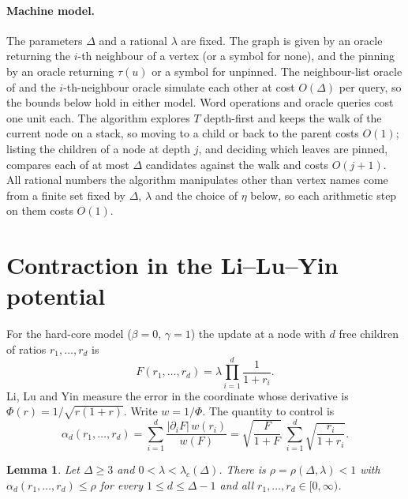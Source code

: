 \documentclass[11pt]{amsart}
\newtheorem{lemma}[theorem]{Lemma}
\newcommand{\lc}{\lambda_c(\Delta)}
\begin{document}
\paragraph{Machine model.} The parameters $\Delta$ and a rational $\lambda$ are fixed. The graph is given by an oracle returning the $i$-th neighbour of a vertex (or a symbol for none), and the pinning by an oracle returning $\tau(u)$ or a symbol for unpinned. The neighbour-list oracle of \cite[Definition~2.2]{CCLZ} and the $i$-th-neighbour oracle simulate each other at cost $O(\Delta)$ per query, so the bounds below hold in either model. Word operations and oracle queries cost one unit each. The algorithm explores $T$ depth-first and keeps the walk of the current node on a stack, so moving to a child or back to the parent costs $O(1)$; listing the children of a node at depth $j$, and deciding which leaves are pinned, compares each of at most $\Delta$ candidates against the walk and costs $O(j+1)$. All rational numbers the algorithm manipulates other than vertex names come from a finite set fixed by $\Delta$, $\lambda$ and the choice of $\eta$ below, so each arithmetic step on them costs $O(1)$.

\section{Contraction in the Li--Lu--Yin potential}\label{sec:contract}
For the hard-core model ($\beta=0$, $\gamma=1$) the update at a node with $d$ free children of ratios $r_1,\dots,r_d$ is
\[
F(r_1,\dots,r_d)=\lambda\prod_{i=1}^d\frac{1}{1+r_i}.
\]
Li, Lu and Yin \cite{LLY} measure the error in the coordinate whose derivative is $\Phi(r)=1/\sqrt{r(1+r)}$. Write $w=1/\Phi$. The quantity to control is
\[
\alpha_d(r_1,\dots,r_d)=\sum_{i=1}^d\frac{|\partial_iF|\,w(r_i)}{w(F)}
=\sqrt{\frac{F}{1+F}}\;\sum_{i=1}^d\sqrt{\frac{r_i}{1+r_i}} .
\]

\begin{lemma}\label{lem:contract}
Let $\Delta\ge3$ and $0<\lambda<\lc$. There is $\rho=\rho(\Delta,\lambda)<1$ with $\alpha_d(r_1,\dots,r_d)\le\rho$ for every $1\le d\le\Delta-1$ and all $r_1,\dots,r_d\in[0,\infty)$.
\end{lemma}
\end{document}
